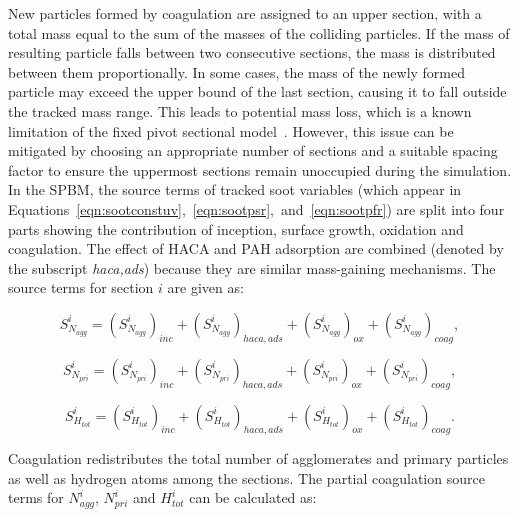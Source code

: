 New particles formed by coagulation are assigned to an upper section, with a total mass equal to the sum of the masses of the colliding particles. If the mass of resulting particle falls between two consecutive sections, the mass is distributed between them proportionally. In some cases, the mass of the newly formed particle may exceed the upper bound of the last section, causing it to fall outside the tracked mass range. This leads to potential mass loss, which is a known limitation of the fixed pivot sectional model~\citep{zhang2010detailed}. However, this issue can be mitigated by choosing an appropriate number of sections and a suitable spacing factor to ensure the uppermost sections remain unoccupied during the simulation. In the SPBM, the source terms of tracked soot variables (which appear in Equations~\ref{eqn:sootconstuv},~\ref{eqn:sootpsr},~and~\ref{eqn:sootpfr}) are split into four parts showing the contribution of inception, surface growth, oxidation and coagulation. The effect of HACA and PAH adsorption are combined (denoted by the subscript \textit{haca,ads}) because they are similar mass-gaining mechanisms. The source terms for section $i$ are given as:

\begin{equation}
	S^i_{N_{agg}} = 
	\left(S^i_{N_{agg}}\right)_{inc}
	+\left(S^i_{N_{agg}}\right)_{haca, ads}
	+\left(S^i_{N_{agg}}\right)_{ox}
	+\left(S^i_{N_{agg}}\right)_{coag}
	\label{eqn:S_Naggsect},
\end{equation}

\begin{equation}
	S^i_{N_{pri}} = 
	\left(S^i_{N_{pri}}\right)_{inc}
	+\left(S^i_{N_{pri}}\right)_{haca, ads}
	+\left(S^i_{N_{pri}}\right)_{ox}
	+\left(S^i_{N_{pri}}\right)_{coag}
	\label{eqn:S_Nprisect},
\end{equation}

\begin{equation}
	S^i_{H_{tot}} = 
	\left(S^i_{H_{tot}}\right)_{inc}
	+\left(S^i_{H_{tot}}\right)_{haca, ads}
	+\left(S^i_{H_{tot}}\right)_{ox}
	+\left(S^i_{H_{tot}}\right)_{coag}
	\label{eqn:S_Htotsect}.
\end{equation}
 
Coagulation redistributes the total number of agglomerates and primary particles as well as hydrogen atoms among the sections. The partial coagulation source terms for ${N^i_{agg}}$, ${N^i_{pri}}$ and ${H^i_{tot}}$ can be calculated as:

